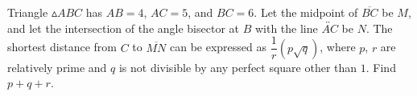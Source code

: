 Triangle $\vartriangle ABC$ has $AB = 4$, $AC = 5$, and $BC = 6$. Let the midpoint of $\overline{BC}$ be $M$, and let the intersection of the angle bisector at $B$ with the line  $\overleftrightarrow{AC}$ be $N$. The shortest distance from $C$ to $\overline{MN}$ can be expressed as $\dfrac{1}{r} (p\sqrt{q})$, where $p$, $r$ are relatively prime and $q$ is not divisible by any perfect square other than $1$. Find $p + q + r$.
